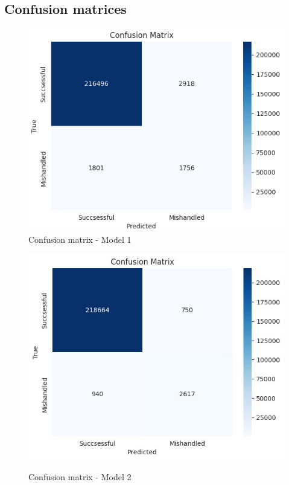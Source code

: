 \documentclass[12pt]{article}
\begin{document}
\subsection*{Confusion matrices}
\FloatBarrier
\begin{figure}
\begin{minipage}[c]{0.45\linewidth}
    \includegraphics[width=1\textwidth]{Confusion_matrix_Model 1.png}\\
    \caption{Confusion matrix - Model 1}
\end{minipage}
\hfill
\begin{minipage}[c]{0.45\linewidth}
    \includegraphics[width=1\textwidth]{Confusion_matrix_Model 2.jpg}\\
    \caption{Confusion matrix - Model 2}
\end{minipage}%
\end{figure}
\end{document}
